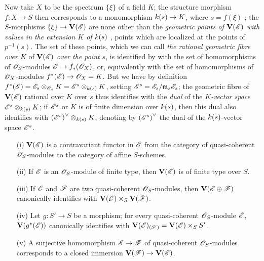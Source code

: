 \begin{env}[1.7.10]
\label{II.1.7.10}
Now take $X$ to be the spectrum $\{\xi\}$ of a field $K$; the structure morphism $f:X\to S$ then corresponds to a monomorphism $\kres(s)\to K$, where $s=f(\xi)$ ; the $S$-morphisms $\{\xi\}\to\bb{V}(\sh{E})$ are none other than the \emph{geometric points of $\mathbf{V}(\mathscr{E})$ with values in the extension $K$ of $k(s)$} , points which are localized at the points of $p^{-1}(s)$.
The set of these points, which we can call \emph{the rational geometric fibre over $K$} of $\mathbf{V}(\mathscr{E})$ \emph{over the point $s$}, is identified by  with the set of homomorphisms of $\mathscr{O}_S$-modules $\sh{E}\to f_*(\sh{O}_X)$, or, equivalently  with the set of homomorphisms of $\mathscr{O}_X$-modules $f^*(\sh{E})\to\sh{O}_X=K$.
But we have by definition  $f^*(\mathscr{E})=\mathscr{E}_s\otimes_{\mathscr{O}_s}K=\mathscr{E}^s\otimes_{k(s)}K$, setting $\mathscr{E}^s=\mathscr{E}_s/\mathfrak{m}_s\mathscr{E}_s$; the geometric fibre of $\mathbf{V}(\mathscr{E})$ rational over $K$ over $s$ thus identifies with the \emph{dual} of the \emph{$K$-vector space $\mathscr{E}^s\otimes_{k(s)}K$}; if $\mathscr{E}^s$ or $K$ is of finite dimension over $k(s)$, then this dual also identifies with ${(\mathscr{E}^s)}^\vee\otimes_{k(s)}K$, denoting by ${(\mathscr{E}^s)}^\vee$ the dual of the $k(s)$-vector space $\mathscr{E}^s$.
\end{env}

\begin{proposition}[1.7.11]
\label{II.1.7.11}
\medskip\noindent
\begin{enumerate}
  \item[{\rm(i)}] $\mathbf{V}(\mathscr{E})$ is a contravariant functor in $\mathscr{E}$ from the category of quasi-coherent $\mathscr{O}_S$-modules to the category of affine $S$-schemes.
  \item[{\rm(ii)}] If $\mathscr{E}$ is an $\mathscr{O}_S$-module of finite type, then $\mathbf{V}(\mathscr{E})$ is of finite type over $S$.
  \item[{\rm(iii)}] If $\mathscr{E}$ and $\mathscr{F}$ are two quasi-coherent $\mathscr{O}_S$-modules, then $\mathbf{V}(\mathscr{E}\oplus\mathscr{F})$ canonically identifies with $\mathbf{V}(\mathscr{E})\times_S\mathbf{V}(\mathscr{F})$.
  \item[{\rm(iv)}] Let $g:S'\to S$ be a morphism; for every quasi-coherent $\mathscr{O}_S$-module $\mathscr{E}$, $\mathbf{V}(g^*(\mathscr{E}))$ canonically identifies with $\mathbf{V}(\mathscr{E})_{(S')}=\mathbf{V}(\mathscr{E})\times_S S'$.
  \item[{\rm(v)}] A surjective homomorphism $\sh{E}\to\sh{F}$ of quasi-coherent $\mathscr{O}_S$-modules corresponds to a closed immersion $\bb{V}(\sh{F})\to\bb{V}(\sh{E})$.
\end{enumerate}
\end{proposition}

